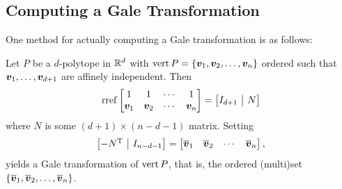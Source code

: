     \subsection{Computing a Gale Transformation}\label{SSec:ComputingGD}
    One method for actually computing a Gale transformation is as follows:

    Let \(P\) be a \(d\)-polytope in \(\mathbb{R}^{d}\) with \(\operatorname{vert} P=\left\{\bm{v}_1,\bm{v}_2,\dotsc, \bm{v}_n\right\}\) ordered such that \(\bm{v}_1,\dotsc, \bm{v}_{d+1}\) are affinely independent.  Then
        \[
            \rref
            \begin{bmatrix}
                1       &1          &\cdots &1      \\
                \ve v_1 &\ve v_2    &\cdots &\ve v_n
            \end{bmatrix}
                =
                    \left[
                        \begin{array}{@{}c|c@{}}
                            I_{d+1} & N
                        \end{array}
                    \right]
        \]
    where \(N\) is some \((d+1)\times(n-d-1)\) matrix.  Setting
        \[
            \left[
                \begin{array}{@{}c|c@{}}
                    -N^{\text{T}}   &   I_{n-d-1}
                \end{array}
            \right]
                =
                    \begin{bmatrix}
                        \ol{\ve v}_1 &\ol{\ve v}_2    &\cdots &\ol{\ve v}_n
                    \end{bmatrix},
        \]
    yields a Gale transformation of \(\operatorname{vert} P\), that is, the ordered (multi)set \(\left\{\overline{\bm{v}}_1, \overline{\bm{v}}_2,\dotsc,\overline{\bm{v}}_n\right\}\).


